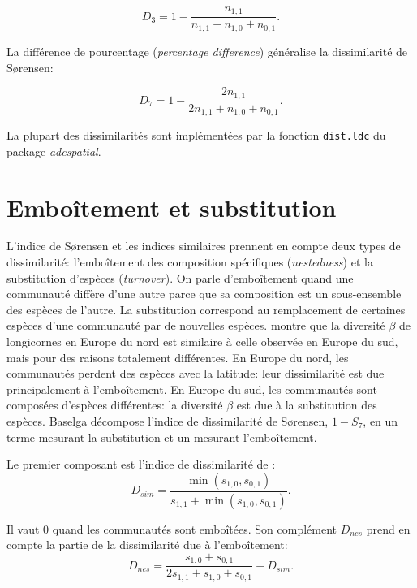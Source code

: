 \documentclass[
  11pt,
  french,
  a4paper,
  extrafontsizes,onecolumn,openright
  ]{memoir}
\begin{document}
\begin{equation}
  \label{eq:Ruzicka}
  D_3 = 1-\frac{n_{1,1}}{n_{1,1}+n_{1,0}+n_{0,1}}.
\end{equation}

La différence de pourcentage (\emph{percentage difference}) généralise la dissimilarité de Sørensen:

\begin{equation}
  \label{eq:percentdiff}
  D_7 = 1- \frac{2n_{1,1}}{2n_{1,1}+n_{1,0}+n_{0,1}}.
\end{equation}

La plupart des dissimilarités sont implémentées par la fonction \texttt{dist.ldc} du package \emph{adespatial}.

\hypertarget{embouxeetement-et-substitution}{%
\section{Emboîtement et substitution}\label{embouxeetement-et-substitution}}

L'indice de Sørensen et les indices similaires prennent en compte deux types de dissimilarité: l'emboîtement des composition spécifiques (\emph{nestedness}) et la substitution d'espèces (\emph{turnover}).
On parle d'emboîtement quand une communauté diffère d'une autre parce que sa composition est un sous-ensemble des espèces de l'autre.
La substitution correspond au remplacement de certaines espèces d'une communauté par de nouvelles espèces.
\textcite{Baselga2010} montre que la diversité \(\beta\) de longicornes en Europe du nord est similaire à celle observée en Europe du sud, mais pour des raisons totalement différentes.
En Europe du nord, les communautés perdent des espèces avec la latitude: leur dissimilarité est due principalement à l'emboîtement.
En Europe du sud, les communautés sont composées d'espèces différentes: la diversité \(\beta\) est due à la substitution des espèces.
Baselga décompose l'indice de dissimilarité de Sørensen, \(1-S_7\), en un terme mesurant la substitution et un mesurant l'emboîtement.

Le premier composant est l'indice de dissimilarité de \textcite{Simpson1943}:
\begin{equation}
  \label{eq:Simpson1943}
  D_{sim} = \frac{\min(s_{1,0},s_{0,1})}{s_{1,1}+\min(s_{1,0},s_{0,1})}.
\end{equation}

Il vaut 0 quand les communautés sont emboîtées.
Son complément \(D_{nes}\) prend en compte la partie de la dissimilarité due à l'emboîtement:
\begin{equation}
  \label{eq:DNesReplBS}
  D_{nes} 
  = \frac{s_{1,0} + s_{0,1}}{2s_{1,1} + s_{1,0} + s_{0,1}}
  - D_{sim}.
\end{equation}
\end{document}
